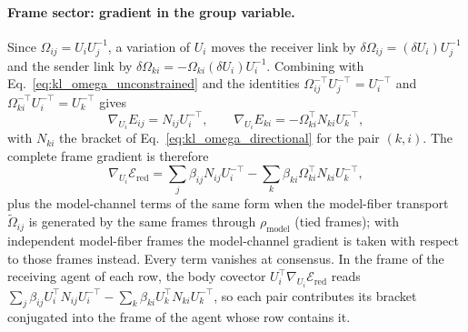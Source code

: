 \paragraph{Frame sector: gradient in the group variable.}
Since $\Omega_{ij} = U_iU_j^{-1}$, a variation of $U_i$ moves the receiver link by $\delta\Omega_{ij} = (\delta U_i)U_j^{-1}$ and the sender link by $\delta\Omega_{ki} = -\Omega_{ki}(\delta U_i)U_i^{-1}$. Combining with Eq.~\eqref{eq:kl_omega_unconstrained} and the identities $\Omega_{ij}^{-\top}U_j^{-\top} = U_i^{-\top}$ and $\Omega_{ki}^{-\top}U_i^{-\top} = U_k^{-\top}$ gives
\begin{equation}
\nabla_{U_i}E_{ij} = N_{ij}U_i^{-\top},
\qquad
\nabla_{U_i}E_{ki} = -\Omega_{ki}^{\top}N_{ki}U_k^{-\top},
\end{equation}
with $N_{ki}$ the bracket of Eq.~\eqref{eq:kl_omega_directional} for the pair $(k, i)$. The complete frame gradient is therefore
\begin{equation}
\nabla_{U_i}\mathcal{E}_{\mathrm{red}} = \sum_j \beta_{ij}N_{ij}U_i^{-\top} - \sum_k \beta_{ki}\Omega_{ki}^{\top}N_{ki}U_k^{-\top},
\label{eq:canonical_gradient_frame}
\end{equation}
plus the model-channel terms of the same form when the model-fiber transport $\tilde\Omega_{ij}$ is generated by the same frames through $\rho_{\mathrm{model}}$ (tied frames); with independent model-fiber frames the model-channel gradient is taken with respect to those frames instead. Every term vanishes at consensus. In the frame of the receiving agent of each row, the body covector $U_i^\top\nabla_{U_i}\mathcal{E}_{\mathrm{red}}$ reads $\sum_j\beta_{ij}U_i^\top N_{ij}U_i^{-\top} - \sum_k\beta_{ki}U_k^\top N_{ki}U_k^{-\top}$, so each pair contributes its bracket conjugated into the frame of the agent whose row contains it.

